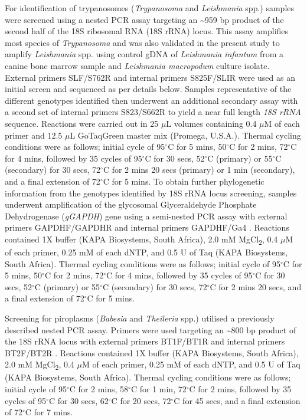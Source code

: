 \documentclass[a4paper, nobind]{templates/ociamthesis}
\begin{document}
For identification of trypanosomes (\emph{Trypanosoma} and \emph{Leishmania} spp.) samples were screened using a nested PCR assay targeting an \textasciitilde959 bp product of the second half of the 18S ribosomal RNA (18S rRNA) locus. This assay amplifies most species of \emph{Trypanosoma} \autocite{mcinnesTrypanosomaIrwiniSp2009} and was also validated in the present study to amplify \emph{Leishmania} spp. using control gDNA of \emph{Leishmania infantum} from a canine bone marrow sample and \emph{Leishmania macropodum} culture isolate. External primers SLF/S762R and internal primers S825F/SLIR were used as an initial screen and sequenced as per details below. Samples representative of the different genotypes identified then underwent an additional secondary assay with a second set of internal primers S823/S662R to yield a near full length \emph{18S rRNA} sequence. Reactions were carried out in 25 \(\mu\)L volumes containing 0.4 \(\mu\)M of each primer and 12.5 \(\mu\)L GoTaq\textregistered Green master mix (Promega, U.S.A.). Thermal cycling conditions were as follows; initial cycle of 95\(^\circ\)C for 5 mins, 50\(^\circ\)C for 2 mins, 72\(^\circ\)C for 4 mins, followed by 35 cycles of 95\(^\circ\)C for 30 secs, 52\(^\circ\)C (primary) or 55\(^\circ\)C (secondary) for 30 secs, 72\(^\circ\)C for 2 mins 20 secs (primary) or 1 min (secondary), and a final extension of 72\(^\circ\)C for 5 mins. To obtain further phylogenetic information from the genotypes identified by 18S rRNA locus screening, samples underwent amplification of the glycosomal Glyceraldehyde Phosphate Dehydrogenase (\emph{gGAPDH}) gene using a semi-nested PCR assay with external primers GAPDHF/GAPDHR and internal primers GAPDHF/Ga4 \autocite{mcinnesTrypanosomaIrwiniSp2009}. Reactions contained 1X buffer (KAPA Biosystems, South Africa), 2.0 mM MgCl\textsubscript{2}, 0.4 \(\mu\)M of each primer, 0.25 mM of each dNTP, and 0.5 U of Taq (KAPA Biosystems, South Africa). Thermal cycling conditions were as follows; initial cycle of 95\(^\circ\)C for 5 mins, 50\(^\circ\)C for 2 mins, 72\(^\circ\)C for 4 mins, followed by 35 cycles of 95\(^\circ\)C for 30 secs, 52\(^\circ\)C (primary) or 55\(^\circ\)C (secondary) for 30 secs, 72\(^\circ\)C for 2 mins 20 secs, and a final extension of 72\(^\circ\)C for 5 mins.

Screening for piroplasms (\emph{Babesia} and \emph{Theileria} spp.) utilised a previously described nested PCR assay. Primers were used targeting an \textasciitilde800 bp product of the 18S rRNA locus with external primers BT1F/BT1R and internal primers BT2F/BT2R \autocite{jefferiesPCRRFLPDetectionDifferentiation2007}. Reactions contained 1X buffer (KAPA Biosystems, South Africa), 2.0 mM MgCl\textsubscript{2}, 0.4 \(\mu\)M of each primer, 0.25 mM of each dNTP, and 0.5 U of Taq (KAPA Biosystems, South Africa). Thermal cycling conditions were as follows; initial cycle of 95\(^\circ\)C for 2 mins, 58\(^\circ\)C for 1 min, 72\(^\circ\)C for 2 mins, followed by 35 cycles of 95\(^\circ\)C for 30 secs, 62\(^\circ\)C for 20 secs, 72\(^\circ\)C for 45 secs, and a final extension of 72\(^\circ\)C for 7 mins.
\end{document}
